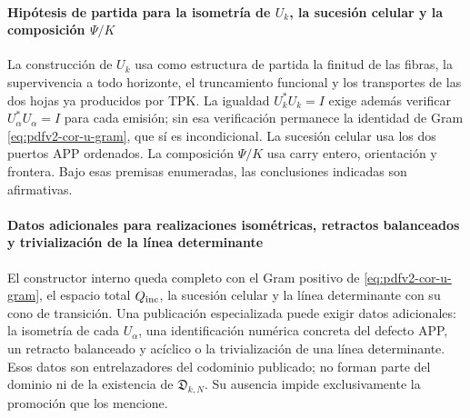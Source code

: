 \paragraph{Hipótesis de partida para la isometría de \(U_k\), la sucesión celular y la composición \(\Psi/K\)}
La construcción de \(U_k\) usa como estructura de partida la finitud de las
fibras, la supervivencia a todo horizonte, el truncamiento funcional y los
transportes de las dos hojas ya producidos por TPK\@. La igualdad
\(U_k^*U_k=I\) exige además verificar \(U_\alpha^*U_\alpha=I\) para cada
emisión; sin esa verificación permanece la identidad de Gram
\eqref{eq:pdfv2-cor-u-gram}, que sí es incondicional. La sucesión celular usa
los dos puertos APP ordenados. La composición \(\Psi/K\) usa carry entero,
orientación y frontera. Bajo esas premisas enumeradas, las conclusiones
indicadas son afirmativas.

\paragraph{Datos adicionales para realizaciones isométricas, retractos balanceados y trivialización de la línea determinante}
El constructor interno queda completo con el Gram positivo de
\eqref{eq:pdfv2-cor-u-gram}, el espacio total \(Q_{\rm inc}\), la sucesión
celular y la línea determinante con su cono de transición. Una publicación
especializada puede exigir datos adicionales: la isometría de cada
\(U_\alpha\), una identificación numérica concreta del defecto APP, un
retracto balanceado y acíclico o la trivialización de una línea
determinante. Esos datos son entrelazadores del codominio publicado; no
forman parte del dominio ni de la existencia de
\(\mathfrak D_{k,N}\). Su ausencia impide exclusivamente la promoción que
los mencione.

